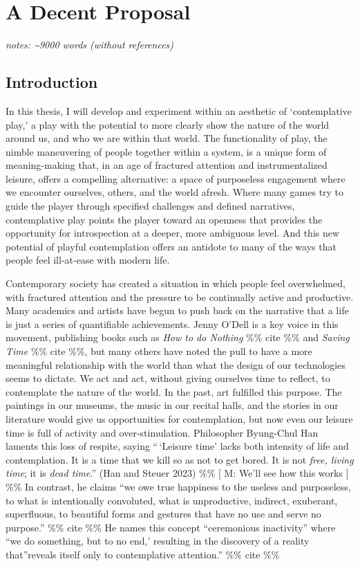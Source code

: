 \documentclass[
]{article}
\author{}
\date{}
\begin{document}
\section{A Decent Proposal}\label{a-decent-proposal}

\emph{notes: \textasciitilde9000 words (without references)}

\subsection{Introduction}\label{introduction}

In this thesis, I will develop and experiment within an aesthetic of
`contemplative play,' a play with the potential to more clearly show the
nature of the world around us, and who we are within that world. The
functionality of play, the nimble maneuvering of people together within
a system, is a unique form of meaning-making that, in an age of
fractured attention and instrumentalized leisure, offers a compelling
alternative: a space of purposeless engagement where we encounter
ourselves, others, and the world afresh. Where many games try to guide
the player through specified challenges and defined narratives,
contemplative play points the player toward an openness that provides
the opportunity for introspection at a deeper, more ambiguous level. And
this new potential of playful contemplation offers an antidote to many
of the ways that people feel ill-at-ease with modern life.

Contemporary society has created a situation in which people feel
overwhelmed, with fractured attention and the pressure to be continually
active and productive. Many academics and artists have begun to push
back on the narrative that a life is just a series of quantifiable
achievements. Jenny O'Dell is a key voice in this movement, publishing
books such as \emph{How to do Nothing} \%\% cite \%\% and \emph{Saving
Time} \%\% cite \%\%, but many others have noted the pull to have a more
meaningful relationship with the world than what the design of our
technologies seems to dictate. We act and act, without giving ourselves
time to reflect, to contemplate the nature of the world. In the past,
art fulfilled this purpose. The paintings in our museums, the music in
our recital halls, and the stories in our literature would give us
opportunities for contemplation, but now even our leisure time is full
of activity and over-stimulation. Philosopher Byung-Chul Han laments
this loss of respite, saying ``\,`Leisure time' lacks both intensity of
life and contemplation. It is a time that we kill so as not to get
bored. It is not \emph{free, living time}; it is \emph{dead time}.''
(Han and Steuer 2023) \%\% {[} M: We'll see how this works {]} \%\% In
contrast, he claims ``we owe true happiness to the useless and
purposeless, to what is intentionally convoluted, what is unproductive,
indirect, exuberant, superfluous, to beautiful forms and gestures that
have no use and serve no purpose.'' \%\% cite \%\% He names this concept
``ceremonious inactivity'' where ``we do something, but to no end,'
resulting in the discovery of a reality that''reveals itself only to
contemplative attention.'' \%\% cite \%\%
\end{document}
